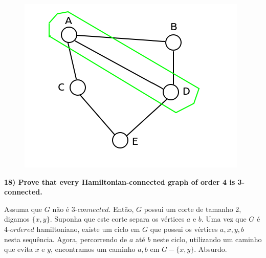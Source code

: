 \documentclass[]{article}
\begin{document}
\begin{figure}[h]
	\begin{center}
		\includegraphics[scale=1]{image/path.png}
	\end{center}
\end{figure}

\newpage

\noindent \textbf{18) Prove that every Hamiltonian-connected graph of order 4 is 3-connected.}

Assuma que $G$ não é $3\mbox{-}connected$. Então, $G$ possui um corte de tamanho 2, digamos $\{x, y\}$. Suponha que este corte separa os vértices $a$ e $b$. Uma vez que $G$ é $4\mbox{-}ordered$ hamiltoniano, existe um ciclo em $G$ que possui os vértices $a, x, y, b$ nesta sequência. Agora, percorrendo de $a$ até $b$ neste ciclo, utilizando um caminho que evita $x$ e $y$, encontramos um caminho $a, b$ em $G-\{x, y\}$. Absurdo.
\end{document}
